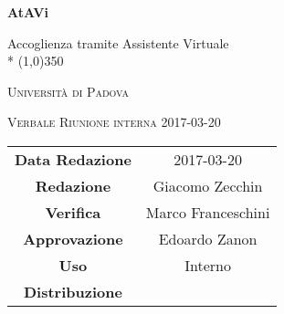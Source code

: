 \documentclass[a4paper,12pt]{article}
\author{Giacomo Zecchin}
\date{2017/03/20}
\begin{document}
\begin{titlepage}
	\centering
	{\huge\bfseries AtAVi\par}
	Accoglienza tramite Assistente Virtuale \\*
	\line(1,0){350} \\
	{\scshape\LARGE Università di Padova \par}
	\vspace{1cm}
	{\scshape\Large Verbale Riunione interna 2017-03-20\par}
	\vspace{1.5cm}
	\logo
	\vspace{2cm}	
	\vfill \vfill
	\begin{tabular}{c|c}
		{\hfill\textbf{Data Redazione}} 		& 2017-03-20	\\
		{\hfill\textbf{Redazione}} 				& Giacomo Zecchin		\\
		{\hfill\textbf{Verifica}} 				& Marco Franceschini 	\\
		{\hfill\textbf{Approvazione}} 			& Edoardo Zanon  \\
		{\hfill\textbf{Uso}} 							& Interno		\\
		{\hfill\textbf{Distribuzione}} 			& \kpanic\		\\
	\end{tabular}
\end{titlepage}

	\pagestyle{myfront}
	\newpage
	\tableofcontents
	
	\label{LastFrontPage}
	
	\newpage
	\pagestyle{mymain}
		
		
		
		
		
		
		
		
	
	\label{LastPage}
\end{document}
